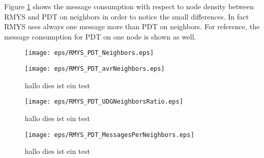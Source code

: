 Figure \ref{fig:RMYS_PDT_Neighbors} shows the message consumption with respect to node density between RMYS and PDT on neighbors in order to notice the small differences.
In fact RMYS uses always one message more than PDT on neighbors.
For reference, the message consumption for PDT on one node is shown as well.

\begin{figure}[h!]
\centering
\texttt{[image: eps/RMYS\_PDT\_Neighbors.eps]}
\caption{}
\label{fig:RMYS_PDT_Neighbors}
\end{figure}



\begin{figure}[h!]
\centering
\texttt{[image: eps/RMYS\_PDT\_avrNeighbors.eps]}
\caption{hallo dies ist ein test}
\label{fig:RMYS_PDT_avrNeighbors}
\end{figure}

\begin{figure}[h!]
\centering
\texttt{[image: eps/RMYS\_PDT\_UDGNeighborsRatio.eps]}
\caption{hallo dies ist ein test}
\label{fig:RMYS_PDT_UDGNeighborsRatio}
\end{figure}

\begin{figure}[h!]
\centering
\texttt{[image: eps/RMYS\_PDT\_MessagesPerNeighbors.eps]}
\caption{hallo dies ist ein test}
\label{fig:RMYS_PDT_MessagesPerNeighbors}
\end{figure}


